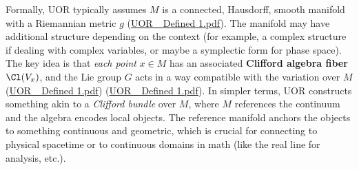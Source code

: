 \documentclass[12pt]{article}
\begin{document}
\medskip

Formally, UOR typically assumes $M$ is a connected, Hausdorff, smooth manifold with a Riemannian metric $g$ (\href{file://file-XiorGa5Wu6KTrCZGytuVSc#:~:text=Reference%20Manifolds%3A%20A%20reference%20manifold,a%20smoothly%20varying}{UOR\_ Defined 1.pdf}). The manifold may have additional structure depending on the context (for example, a complex structure if dealing with complex variables, or maybe a symplectic form for phase space). The key idea is that \emph{each point} $x \in M$ has an associated \textbf{Clifford algebra fiber} $\Cl(V_x)$, and the Lie group $G$ acts in a way compatible with the variation over $M$ (\href{file://file-XiorGa5Wu6KTrCZGytuVSc#:~:text=reference%20manifold%20with%20a%20Clifford,measuring%20the%20size%20of%20Clifford}{UOR\_ Defined 1.pdf}) (\href{file://file-XiorGa5Wu6KTrCZGytuVSc#:~:text=reference%20manifold%20with%20a%20Clifford,measuring%20the%20size%20of%20Clifford}{UOR\_ Defined 1.pdf}). In simpler terms, UOR constructs something akin to a \emph{Clifford bundle} over $M$, where $M$ references the continuum and the algebra encodes local objects. The reference manifold anchors the objects to something continuous and geometric, which is crucial for connecting to physical spacetime or to continuous domains in math (like the real line for analysis, etc.).

\medskip
\end{document}
